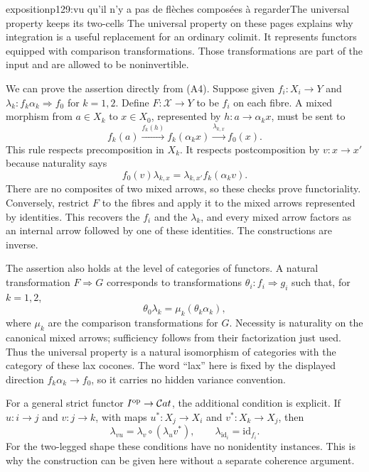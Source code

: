 \begin{dcomment}{exposition}{p129:vu qu'il n'y a pas de flèches composées à regarder}{The universal property keeps its two-cells}
The universal property on these pages explains why integration is a useful replacement for an ordinary colimit.  It represents functors equipped with comparison transformations.  Those transformations are part of the input and are allowed to be noninvertible.

We can prove the assertion directly from (A4).  Suppose given $f_i:X_i\to Y$ and $\lambda_k:f_k\alpha_k\Rightarrow f_0$ for $k=1,2$.  Define $F:\mathcal X\to Y$ to be $f_i$ on each fibre.  A mixed morphism from $a\in X_k$ to $x\in X_0$, represented by $h:a\to\alpha_kx$, must be sent to
\[
 f_k(a)\xrightarrow{f_k(h)}f_k(\alpha_kx)
       \xrightarrow{\lambda_{k,x}}f_0(x).
 \tag{A8}
\]
This rule respects precomposition in $X_k$.  It respects postcomposition by $v:x\to x'$ because naturality says
\[
 f_0(v)\lambda_{k,x}=\lambda_{k,x'}f_k(\alpha_kv).
\]
There are no composites of two mixed arrows, so these checks prove functoriality.  Conversely, restrict $F$ to the fibres and apply it to the mixed arrows represented by identities.  This recovers the $f_i$ and the $\lambda_k$, and every mixed arrow factors as an internal arrow followed by one of these identities.  The constructions are inverse.

The assertion also holds at the level of categories of functors.  A natural transformation $F\Rightarrow G$ corresponds to transformations $\theta_i:f_i\Rightarrow g_i$ such that, for $k=1,2$,
\[
 \theta_0\lambda_k=\mu_k(\theta_k\alpha_k),
\]
where $\mu_k$ are the comparison transformations for $G$.  Necessity is naturality on the canonical mixed arrows; sufficiency follows from their factorization just used.  Thus the universal property is a natural isomorphism of categories with the category of these lax cocones.  The word ``lax'' here is fixed by the displayed direction $f_k\alpha_k\to f_0$, so it carries no hidden variance convention.

For a general strict functor $I^{\mathrm{op}}\to\mathcal{C}at$, the additional condition is explicit.  If $u:i\to j$ and $v:j\to k$, with maps $u^*:X_j\to X_i$ and $v^*:X_k\to X_j$, then
\[
 \lambda_{vu}=\lambda_v\circ(\lambda_u v^*),
 \qquad \lambda_{\mathrm{id}_i}=\mathrm{id}_{f_i}.
\]
For the two-legged shape these conditions have no nonidentity instances.  This is why the construction can be given here without a separate coherence argument.


\end{dcomment}
